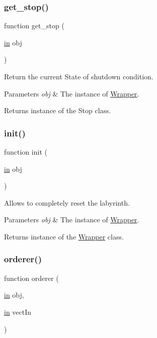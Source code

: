 \subsubsection{\texorpdfstring{get\+\_\+stop()}{get\_stop()}}
{\footnotesize\ttfamily function get\+\_\+stop (\begin{DoxyParamCaption}\item[{\hyperlink{class_wrapper_a5e252d97ca5bf85c5753e2914673eead}{in}}]{obj }\end{DoxyParamCaption})}



Return the current State of shutdown condition. 


\begin{DoxyParams}{Parameters}
{\em obj} & The instance of \hyperlink{class_wrapper}{Wrapper}. \\
\hline
\end{DoxyParams}
\begin{DoxyReturn}{Returns}
instance of the Stop class. 
\end{DoxyReturn}
\mbox{\label{class_wrapper_a7d486dd79e7c7bc857ffaa4e273d27c5}} 
\subsubsection{\texorpdfstring{init()}{init()}}
{\footnotesize\ttfamily function init (\begin{DoxyParamCaption}\item[{\hyperlink{class_wrapper_a5e252d97ca5bf85c5753e2914673eead}{in}}]{obj }\end{DoxyParamCaption})}



Allows to completely reset the labyrinth. 


\begin{DoxyParams}{Parameters}
{\em obj} & The instance of \hyperlink{class_wrapper}{Wrapper}. \\
\hline
\end{DoxyParams}
\begin{DoxyReturn}{Returns}
instance of the \hyperlink{class_wrapper}{Wrapper} class. 
\end{DoxyReturn}
\mbox{\label{class_wrapper_a9c889c73b9d4b80dde64dfe385ed747e}} 
\subsubsection{\texorpdfstring{orderer()}{orderer()}}
{\footnotesize\ttfamily function orderer (\begin{DoxyParamCaption}\item[{\hyperlink{class_wrapper_a5e252d97ca5bf85c5753e2914673eead}{in}}]{obj,  }\item[{\hyperlink{class_wrapper_a5e252d97ca5bf85c5753e2914673eead}{in}}]{vect\+In }\end{DoxyParamCaption})}



